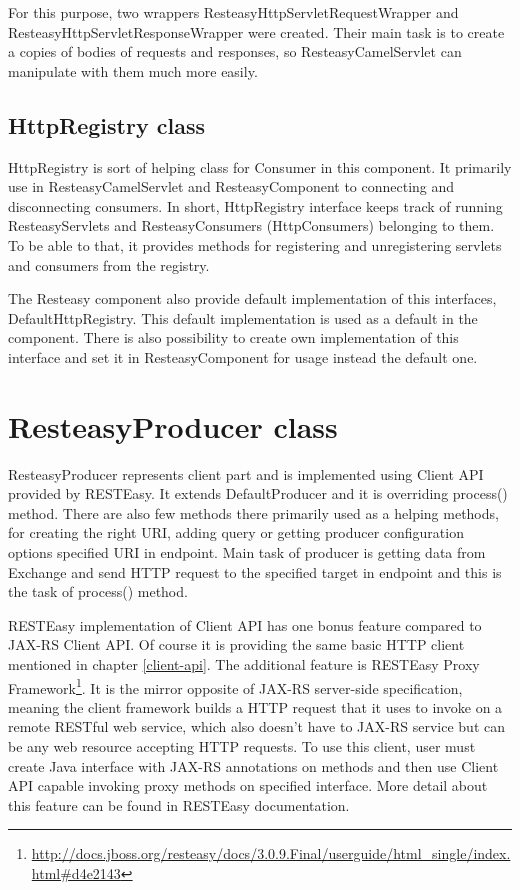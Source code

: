 \documentclass[12pt,final,oneside]{fithesis2}
\begin{document}
For this purpose, two wrappers ResteasyHttpServletRequestWrapper and ResteasyHttpServletResponseWrapper were created. Their main task is to create a copies of bodies of requests and responses, so  ResteasyCamelServlet can manipulate with them much more easily.


\subsection{HttpRegistry class}\label{registry}
HttpRegistry is sort of helping class for Consumer in this component. It primarily use in ResteasyCamelServlet and ResteasyComponent to connecting and disconnecting consumers. In short, HttpRegistry interface keeps track of running ResteasyServlets and ResteasyConsumers (HttpConsumers) belonging to them.  To be able to that, it provides methods for registering and unregistering servlets and consumers from the registry.

The Resteasy component also provide default implementation of this interfaces, DefaultHttpRegistry. This default implementation is used as a default in the component. There is also possibility to create own implementation of this interface and set it in ResteasyComponent for usage instead the default one. 


\section{ResteasyProducer class}
ResteasyProducer represents client part and is implemented using Client API provided by RESTEasy. It extends DefaultProducer and it is overriding process() method. There are also few methods there primarily used as a helping methods, for creating the right URI, adding query or getting producer configuration options specified URI in endpoint. Main task of producer is getting data from Exchange and send HTTP request to the specified target in endpoint and this is the task of process() method. 

RESTEasy implementation of Client API has one bonus feature compared to JAX-RS Client API. Of course it is providing the same basic HTTP client mentioned in chapter \ref{client-api}. The additional feature is RESTEasy Proxy Framework\footnote{\url{http://docs.jboss.org/resteasy/docs/3.0.9.Final/userguide/html_single/index.html\#d4e2143}}. It is the mirror opposite of JAX-RS server-side specification, meaning the client framework builds a HTTP request that it uses to invoke on a remote RESTful web service, which also doesn't have to JAX-RS service but can be any web resource accepting HTTP requests. To use this client, user must create Java interface with JAX-RS annotations on methods and then use Client API capable invoking proxy methods on specified interface\cite{resteasy-doc}. More detail about this feature can be found in RESTEasy documentation. 
\end{document}
